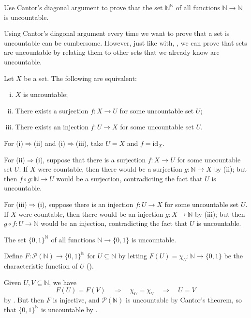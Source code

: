 \begin{exercise}
Use Cantor's diagonal argument to prove that the set $\mathbb{N}^{\mathbb{N}}$ of all functions $\mathbb{N} \to \mathbb{N}$ is uncountable.
\end{exercise}

Using Cantor's diagonal argument every time we want to prove that a set is uncountable can be cumbersome. However, just like with, , we can prove that sets are uncountable by relating them to other sets that we already know are uncountable.

\begin{theorem}
\label{thmUncountableFromInjSurj}
Let $X$ be a set. The following are equivalent:
\begin{enumerate}[(i)]
\item $X$ is uncountable;
\item \label{testitem} There exists a surjection $f : X \to U$ for some uncountable set $U$;
\item There exists an injection $f : U \to X$ for some uncountable set $U$.
\end{enumerate}
\end{theorem}

\begin{cproof}
For (i)$\Rightarrow$(ii) and (i)$\Rightarrow$(iii), take $U=X$ and $f=\mathrm{id}_X$.

For (ii)$\Rightarrow$(i), suppose that there is a surjection $f : X \to U$ for some uncountable set $U$. If $X$ were countable, then there would be a surjection $g : \mathbb{N} \to X$ by (ii); but then $f \circ g : \mathbb{N} \to U$ would be a surjection, contradicting the fact that $U$ is uncountable.

For (iii)$\Rightarrow$(i), suppose there is an injection $f : U \to X$ for some uncountable set $U$. If $X$ were countable, then there would be an injection $g : X \to \mathbb{N}$ by (iii); but then $g \circ f : U \to \mathbb{N}$ would be an injection, contradicting the fact that $U$ is uncountable.
\end{cproof}

\begin{proposition}
\label{propBinarySequencesAreUncountable}
The set $\{0,1\}^{\mathbb{N}}$ of all functions $\mathbb{N} \to \{0,1\}$ is uncountable.
\end{proposition}

\begin{cproof}
Define $F : \mathcal{P}(\mathbb{N}) \to \{0,1\}^{\mathbb{N}}$ for $U \subseteq \mathbb{N}$ by letting $F(U) = \chi_U : \mathbb{N} \to \{0,1\}$ be the characteristic function of $U$ ().

Given $U, V \subseteq \mathbb{N}$, we have
\[ F(U) = F(V) \quad \Rightarrow \quad \chi_U = \chi_V \quad \Rightarrow \quad U = V \]
by . But then $F$ is injective, and $\mathcal{P}(\mathbb{N})$ is uncountable by Cantor's theorem, so that $\{0,1\}^{\mathbb{N}}$ is uncountable by .
\end{cproof}

